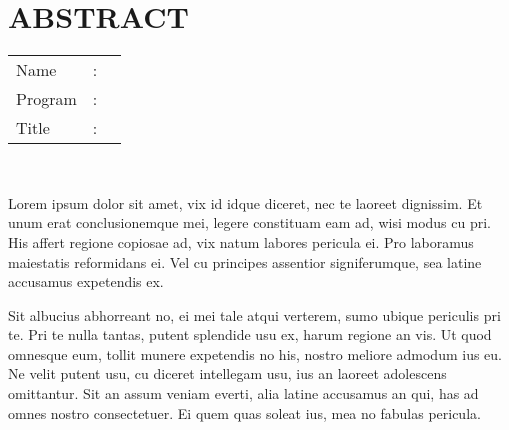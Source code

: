 %
%
%

\chapter*{ABSTRACT}

\vspace*{0.2cm}

\noindent \begin{tabular}{l l p{11.0cm}}
	Name&: & \penulis \\
	Program&: & \program \\
	Title&: & \judulInggris \\
\end{tabular} \\ 

\vspace*{0.5cm}

Lorem ipsum dolor sit amet, vix id idque diceret, nec te laoreet dignissim. Et unum erat conclusionemque mei, legere constituam eam ad, wisi modus cu pri. His affert regione copiosae ad, vix natum labores pericula ei. Pro laboramus maiestatis reformidans ei. Vel cu principes assentior signiferumque, sea latine accusamus expetendis ex.

Sit albucius abhorreant no, ei mei tale atqui verterem, sumo ubique periculis pri te. Pri te nulla tantas, putent splendide usu ex, harum regione an vis. Ut quod omnesque eum, tollit munere expetendis no his, nostro meliore admodum ius eu. Ne velit putent usu, cu diceret intellegam usu, ius an laoreet adolescens omittantur. Sit an assum veniam everti, alia latine accusamus an qui, has ad omnes nostro consectetuer. Ei quem quas soleat ius, mea no fabulas pericula.




\newpage
